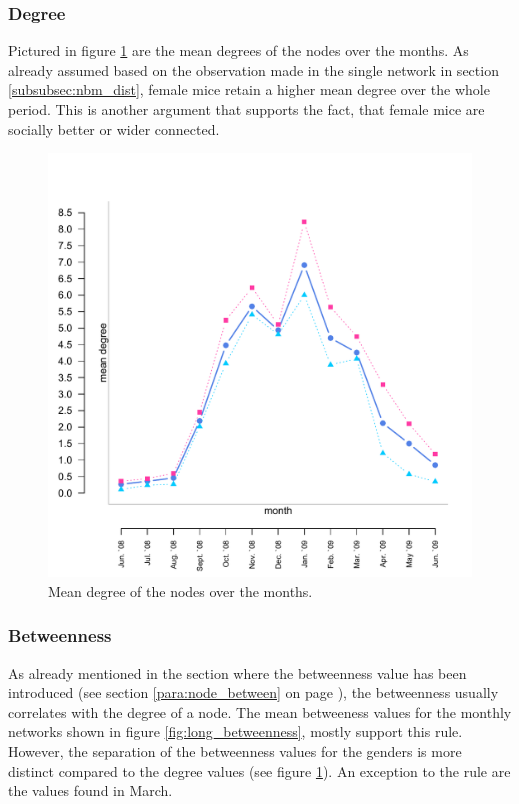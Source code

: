 \subsubsection{Degree}

Pictured in figure \ref{fig:long_degree} are the mean degrees of the nodes over the months. As already assumed based on the observation made in the single network in section \ref{subsubsec:nbm_dist}, female mice retain a higher mean degree over the whole period. This is another argument that supports the fact, that female mice are socially better or wider connected.

\begin{figure}[htpb]
\begin{center}
  \includegraphics[width=.6\textwidth]{assets/pdf/long_degree.pdf}
  \caption[Mean degree of the nodes over the months]{Mean degree of the nodes over the months.}
  \label{fig:long_degree}
\end{center}
\end{figure} 


\subsubsection{Betweenness}
\label{subsubsec:long_betweenness}

As already mentioned in the section where the betweenness value has been introduced (see section \ref{para:node_between} on page \pageref{para:node_between}), the betweenness usually correlates with the degree of a node. The mean betweeness values for the monthly networks shown in figure \ref{fig:long_betweenness}, mostly support this rule. However, the separation of the betweenness values for the genders is more distinct compared to the degree values (see figure \ref{fig:long_degree}). An exception to the rule are the values found in March.   

